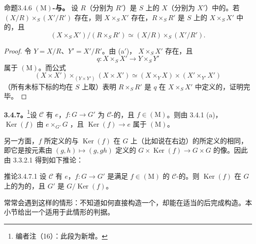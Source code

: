 \begin{SGAresult}{命题}{3.4.6}
\textbf{$(\mathrm M)$-与。}
设 $R$（分别为 $R'$）是 $S$ 上的 $X$（分别为 $X'$）中的。若 $(X/R)\times_S(X'/R')$ 存在，则 $X\times_S X'$ 存在，$R\times_S R'$ 是 $S$ 上的 $X\times_S X'$ 中的，且
\[
 (X\times_S X')/(R\times_S R')\simeq(X/R)\times_S(X'/R').
\]
\end{SGAresult}
\begin{proof}
令 $Y=X/R$、$Y'=X'/R'$。由 (a$'$)， $X\times_S X'$ 存在，且
\[
 q:X\times_S X'\longrightarrow Y\times_S Y'
\]
属于 $(\mathrm M)$。而公式
\[
 (X\times X')\times_{(Y\times Y')}(X\times X')\simeq(X\times_Y X)\times(X'\times_{Y'}X')
\]
（所有未标下标的均在 $S$ 上取）表明 $R\times_S R'$ 是 $q$ 在 $X\times_S X'$ 中定义的，证明完毕。
\end{proof}
\textbf{3.4.7。}\footnote{编者注（16）：此段为新增。}设 $\mathcal C$ 有 $e$，$f:G\to G'$ 为 $\mathcal C$-的，且 $f\in(\mathrm M)$。则由 3.4.1 (a)， $\operatorname{Ker}(f)$ 由 $e\times_{G'}G$ ，且 $\operatorname{Ker}(f)\to e$ 属于 $(\mathrm M)$。

另一方面，$f$ 所定义的与 $\operatorname{Ker}(f)$ 在 $G$ 上（比如说在右边）的所定义的相同，即它是按元素由 $(g,h)\mapsto(g,gh)$ 定义的 $G\times\operatorname{Ker}(f)\to G\times G$ 的像。因此由 3.3.2.1 得到如下推论：
\begin{SGAresult}{推论}{3.4.7.1}
设 $\mathcal C$ 有 $e$，$f:G\to G'$ 是满足 $f\in(\mathrm M)$ 的 $\mathcal C$-的。则 $\operatorname{Ker}(f)$ 在 $G$ 上的为的，且 $G'$ 是 $G/\operatorname{Ker}(f)$。
\end{SGAresult}
常常会遇到这样的情形：不知道如何直接构造一个，却能在适当的后完成构造。本小节给出一个适用于此情形的判据。

